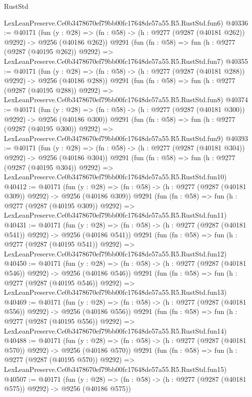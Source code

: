 \begin{lexlean}{RustStd}
\begin{coremodule}
    LexLeanPreserve.Ce0b3478670ef79bb00fc17648de57a55.R5.RustStd.fun6)
@40336 := @40171
    (fun (y : @28) => (fn : @58) -> (h : @9277 (@9287 (@40181 @262)) @9292) -> @9256 (@40186 @262))
    @9291
    (fun (fn : @58) =>
    fun (h : @9277 (@9287 (@40195 @262)) @9292) =>
    LexLeanPreserve.Ce0b3478670ef79bb00fc17648de57a55.R5.RustStd.fun7)
@40355 := @40171
    (fun (y : @28) => (fn : @58) -> (h : @9277 (@9287 (@40181 @288)) @9292) -> @9256 (@40186 @288))
    @9291
    (fun (fn : @58) =>
    fun (h : @9277 (@9287 (@40195 @288)) @9292) =>
    LexLeanPreserve.Ce0b3478670ef79bb00fc17648de57a55.R5.RustStd.fun8)
@40374 := @40171
    (fun (y : @28) => (fn : @58) -> (h : @9277 (@9287 (@40181 @300)) @9292) -> @9256 (@40186 @300))
    @9291
    (fun (fn : @58) =>
    fun (h : @9277 (@9287 (@40195 @300)) @9292) =>
    LexLeanPreserve.Ce0b3478670ef79bb00fc17648de57a55.R5.RustStd.fun9)
@40393 := @40171
    (fun (y : @28) => (fn : @58) -> (h : @9277 (@9287 (@40181 @304)) @9292) -> @9256 (@40186 @304))
    @9291
    (fun (fn : @58) =>
    fun (h : @9277 (@9287 (@40195 @304)) @9292) =>
    LexLeanPreserve.Ce0b3478670ef79bb00fc17648de57a55.R5.RustStd.fun10)
@40412 := @40171
    (fun (y : @28) => (fn : @58) -> (h : @9277 (@9287 (@40181 @309)) @9292) -> @9256 (@40186 @309))
    @9291
    (fun (fn : @58) =>
    fun (h : @9277 (@9287 (@40195 @309)) @9292) =>
    LexLeanPreserve.Ce0b3478670ef79bb00fc17648de57a55.R5.RustStd.fun11)
@40431 := @40171
    (fun (y : @28) => (fn : @58) -> (h : @9277 (@9287 (@40181 @541)) @9292) -> @9256 (@40186 @541))
    @9291
    (fun (fn : @58) =>
    fun (h : @9277 (@9287 (@40195 @541)) @9292) =>
    LexLeanPreserve.Ce0b3478670ef79bb00fc17648de57a55.R5.RustStd.fun12)
@40450 := @40171
    (fun (y : @28) => (fn : @58) -> (h : @9277 (@9287 (@40181 @546)) @9292) -> @9256 (@40186 @546))
    @9291
    (fun (fn : @58) =>
    fun (h : @9277 (@9287 (@40195 @546)) @9292) =>
    LexLeanPreserve.Ce0b3478670ef79bb00fc17648de57a55.R5.RustStd.fun13)
@40469 := @40171
    (fun (y : @28) => (fn : @58) -> (h : @9277 (@9287 (@40181 @556)) @9292) -> @9256 (@40186 @556))
    @9291
    (fun (fn : @58) =>
    fun (h : @9277 (@9287 (@40195 @556)) @9292) =>
    LexLeanPreserve.Ce0b3478670ef79bb00fc17648de57a55.R5.RustStd.fun14)
@40488 := @40171
    (fun (y : @28) => (fn : @58) -> (h : @9277 (@9287 (@40181 @570)) @9292) -> @9256 (@40186 @570))
    @9291
    (fun (fn : @58) =>
    fun (h : @9277 (@9287 (@40195 @570)) @9292) =>
    LexLeanPreserve.Ce0b3478670ef79bb00fc17648de57a55.R5.RustStd.fun15)
@40507 := @40171
    (fun (y : @28) => (fn : @58) -> (h : @9277 (@9287 (@40181 @575)) @9292) -> @9256 (@40186 @575))

\end{coremodule}
\end{lexlean}
